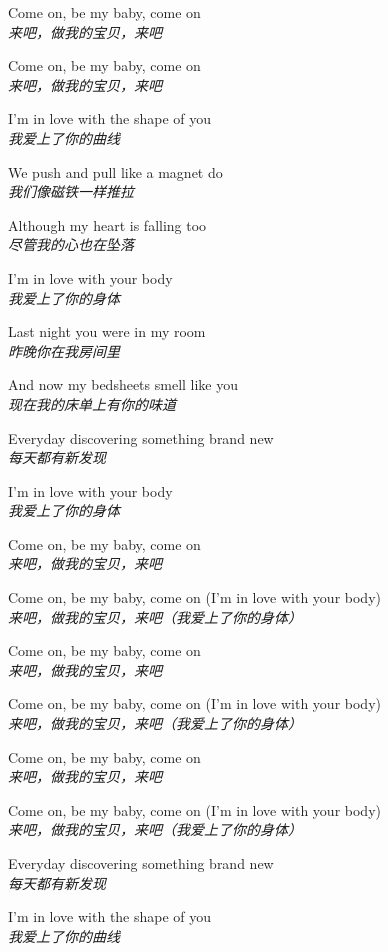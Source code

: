 \begin{spacing}{1.5}
\begin{flushleft}
Come on, be my baby, come on\\
\textit{来吧，做我的宝贝，来吧}\lyricspace

Come on, be my baby, come on\\
\textit{来吧，做我的宝贝，来吧}\lyricspace

I'm in love with the shape of you\\
\textit{我爱上了你的曲线}\lyricspace

We push and pull like a magnet do\\
\textit{我们像磁铁一样推拉}\lyricspace

Although my heart is falling too\\
\textit{尽管我的心也在坠落}\lyricspace

I'm in love with your body\\
\textit{我爱上了你的身体}\lyricspace

Last night you were in my room\\
\textit{昨晚你在我房间里}\lyricspace

And now my bedsheets smell like you\\
\textit{现在我的床单上有你的味道}\lyricspace

Everyday discovering something brand new\\
\textit{每天都有新发现}\lyricspace

I'm in love with your body\\
\textit{我爱上了你的身体}\lyricspace

Come on, be my baby, come on\\
\textit{来吧，做我的宝贝，来吧}\lyricspace

Come on, be my baby, come on (I'm in love with your body)\\
\textit{来吧，做我的宝贝，来吧（我爱上了你的身体）}\lyricspace

Come on, be my baby, come on\\
\textit{来吧，做我的宝贝，来吧}\lyricspace

Come on, be my baby, come on (I'm in love with your body)\\
\textit{来吧，做我的宝贝，来吧（我爱上了你的身体）}\lyricspace

Come on, be my baby, come on\\
\textit{来吧，做我的宝贝，来吧}\lyricspace

Come on, be my baby, come on (I'm in love with your body)\\
\textit{来吧，做我的宝贝，来吧（我爱上了你的身体）}\lyricspace

Everyday discovering something brand new\\
\textit{每天都有新发现}\lyricspace

I'm in love with the shape of you\\
\textit{我爱上了你的曲线}\lyricspace
\end{flushleft}
\end{spacing} 
